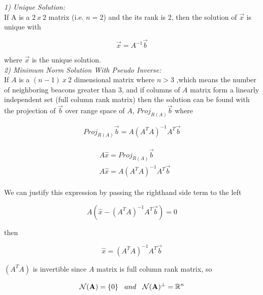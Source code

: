 \textit{1) Unique Solution:}\\
 If A is a $2\ x\ 2$ matrix (i.e. $n=2$) and the its rank is $2$, then the solution of $\vec{x}$ is unique with \cite{linear_ders_notu}

\begin{equation}
\vec{x} = A^{-1}\vec{b}
\end{equation}

where $\vec{x}$ is the unique solution. \\
  
\textit{ 2) Minimum Norm Solution With Pseudo Inverse:} \\  
If $A$ is a $(n-1)\ x\ 2$ dimensional matrix where $n>3$ ,which means the number of neighboring beacons greater than $3$, and if columns of $A$ matrix form a linearly independent set (full column rank matrix) then the solution can be found with the projection of $\vec{b}$ over range space of $A$, $Proj_{R(A)}\vec{b}$ where \cite{linear_ders_notu}

\begin{equation}
Proj_{R(A)}\vec{b} = A (A^TA)^{-1}A^T\vec{b}
\end{equation}

\begin{align}
\begin{split}
& A\hat{x} = Proj_{R(A)}\vec{b}\\
& A\hat{x} = A(A^TA)^{-1}A^T\vec{b}
\end{split}
\end{align}
 
We can justify this expression by passing the righthand side term to the left

\begin{equation}
 A(\hat{x} - (A^TA)^{-1}A^T\vec{b}) = 0
\end{equation}

then 

\begin{equation}
\hat{x} = (A^TA)^{-1}A^T\vec{b}
\end{equation}
  
$(A^TA)$ is invertible since $A$ matrix is full column rank matrix, so 

\begin{align}
\begin{split}
\mathcal{N}(\mathbf{A}) = \{0\} \hspace{0.3cm}  and  \hspace{0.3cm}  \mathcal{N}(\mathbf{A})^\perp =\mathbb{R} ^n 
\end{split}
\end{align}
  
